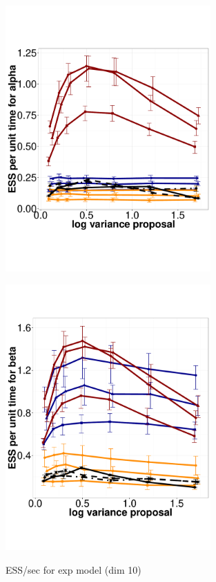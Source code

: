   \begin{figure}%
  \centering
  \begin{minipage}[hp]{0.45\linewidth}
  \centering
    \includegraphics [width=0.70\textwidth, angle=0]{figs/exp_10_alpha.pdf}
      \end{minipage}
  \begin{minipage}[!hp]{0.45\linewidth}
  \centering
    \includegraphics [width=0.70\textwidth, angle=0]{figs/exp_10_beta.pdf}
    \vspace{-0 in}
     \label{fig:ESS_EXP_D10}
  \end{minipage}
    \caption{ESS/sec for exp model (dim 10)}
  \end{figure}
  

